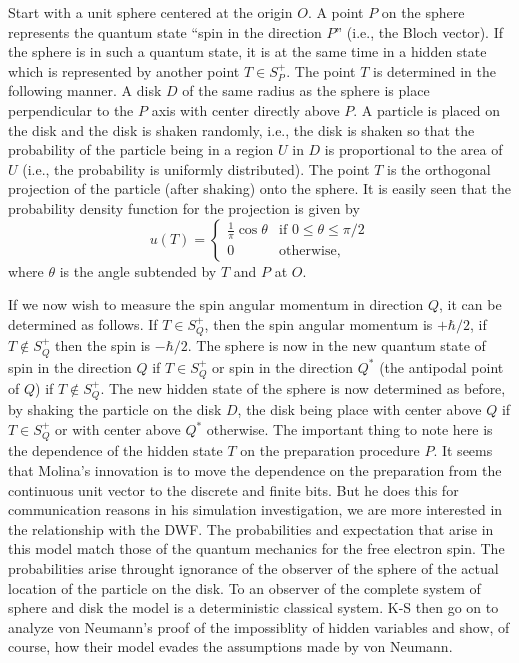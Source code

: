 \documentclass[12pt,draft]{article}
\theoremstyle{definition}
\theoremstyle{plain}
\begin{document}
    Start with a unit sphere centered at the origin $O$. A
    point $P$ on the sphere represents the quantum state
    ``spin in the direction $P$'' (i.e., the Bloch vector).
    If the sphere is in such a quantum state, it is at the
    same time in a hidden state which is represented by
    another point $T \in S_P^+$. The point $T$ is determined
    in the following manner. A disk $D$ of the same radius
    as the sphere is place perpendicular to the $P$ axis
    with center directly above $P$. A particle is placed on
    the disk and the disk is shaken randomly, i.e., the disk
    is shaken so that the probability of the particle being
    in a region $U$ in $D$ is proportional to the area of
    $U$ (i.e., the probability is uniformly distributed).
    The point $T$ is the orthogonal projection of the
    particle (after shaking) onto the sphere. It is easily
    seen that the probability density function for the
    projection is given by 
    \begin{equation}
        u(T)
        = \begin{cases}
            \frac{1}{\pi} \cos\theta & \text{if } 0 \leq
            \theta \leq \pi / 2 \\
            0 & \text{otherwise,}
        \end{cases}
    \end{equation}
    where $\theta$ is the angle subtended by $T$ and $P$ at
    $O$.

    If we now wish to measure the spin angular momentum in
    direction $Q$, it can be determined as follows. If $T
    \in S^+_Q$, then the spin angular momentum is $+\hbar /
    2$, if  $T \not\in S^+_Q$ then the spin is $-\hbar / 2$.
    The sphere is now in the new quantum state of spin in
    the direction $Q$ if $T \in S^+_Q$ or spin in the
    direction $Q^{*}$ (the antipodal point of $Q$) if $T
    \not \in S^+_Q$. The new hidden state of the sphere is
    now determined as before, by shaking the particle on the
    disk $D$, the disk being place with center above $Q$ if
    $T \in S^+_Q$ or with center above $Q^{*}$ otherwise.
    {\color{blue} The important thing to note here is the
        dependence of the hidden state $T$ on the
        preparation procedure $P$. It seems that Molina's
        innovation is to move the dependence on the
        preparation from the continuous unit vector to the
        discrete and finite bits. But he does this for
        communication reasons in his simulation
        investigation, we are more interested in the
        relationship with the DWF.
    } The probabilities and expectation that arise in this
    model match those of the quantum mechanics for the free
    electron spin. The probabilities arise throught
    ignorance of the observer of the sphere of the actual
    location of the particle on the disk. To an observer of
    the complete system of sphere and disk the model is a
    deterministic classical system. K-S then go on to
    analyze von Neumann's proof of the impossiblity of
    hidden variables and show, of course, how their model
    evades the assumptions made by von Neumann.
\end{document}
